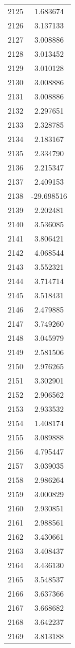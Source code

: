 \documentclass[12pt]{article}
\begin{document}
\begin{longtable}{@{}cc@{}}
2125 & 1.683674 \\
2126 & 3.137133 \\
2127 & 3.008886 \\
2128 & 3.013452 \\
2129 & 3.010128 \\
2130 & 3.008886 \\
2131 & 3.008886 \\
2132 & 2.297651 \\
2133 & 2.328785 \\
2134 & 2.183167 \\
2135 & 2.334790 \\
2136 & 2.215347 \\
2137 & 2.409153 \\
2138 & -29.698516 \\
2139 & 2.202481 \\
2140 & 3.536085 \\
2141 & 3.806421 \\
2142 & 4.068544 \\
2143 & 3.552321 \\
2144 & 3.714714 \\
2145 & 3.518431 \\
2146 & 2.479885 \\
2147 & 3.749260 \\
2148 & 3.045979 \\
2149 & 2.581506 \\
2150 & 2.976265 \\
2151 & 3.302901 \\
2152 & 2.906562 \\
2153 & 2.933532 \\
2154 & 1.408174 \\
2155 & 3.089888 \\
2156 & 4.795447 \\
2157 & 3.039035 \\
2158 & 2.986264 \\
2159 & 3.000829 \\
2160 & 2.930851 \\
2161 & 2.988561 \\
2162 & 3.430661 \\
2163 & 3.408437 \\
2164 & 3.436130 \\
2165 & 3.548537 \\
2166 & 3.637366 \\
2167 & 3.668682 \\
2168 & 3.642237 \\
2169 & 3.813188 \\

\end{longtable}
\end{document}
